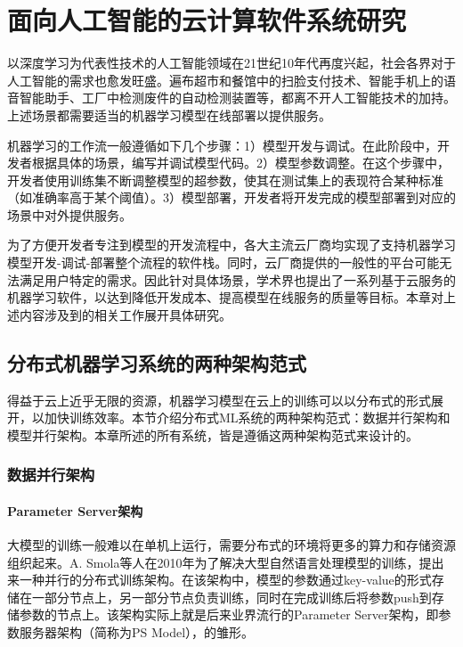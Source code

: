 
\chapter{面向人工智能的云计算软件系统研究}
以深度学习为代表性技术的人工智能领域在21世纪10年代再度兴起，社会各界对于人工智能的需求也愈发旺盛。遍布超市和餐馆中的扫脸支付技术、智能手机上的语音智能助手、工厂中检测废件的自动检测装置等，都离不开人工智能技术的加持。上述场景都需要适当的机器学习模型在线部署以提供服务。

机器学习的工作流一般遵循如下几个步骤：1）模型开发与调试。在此阶段中，开发者根据具体的场景，编写并调试模型代码。2）模型参数调整。在这个步骤中，开发者使用训练集不断调整模型的超参数，使其在测试集上的表现符合某种标准（如准确率高于某个阈值）。3）模型部署，开发者将开发完成的模型部署到对应的场景中对外提供服务。

为了方便开发者专注到模型的开发流程中，各大主流云厂商均实现了支持机器学习模型开发-调试-部署整个流程的软件栈。同时，云厂商提供的一般性的平台可能无法满足用户特定的需求。因此针对具体场景，学术界也提出了一系列基于云服务的机器学习软件，以达到降低开发成本、提高模型在线服务的质量等目标。本章对上述内容涉及到的相关工作展开具体研究。

\section{分布式机器学习系统的两种架构范式}

得益于云上近乎无限的资源，机器学习模型在云上的训练可以以分布式的形式展开，以加快训练效率。本节介绍分布式ML系统的两种架构范式：数据并行架构和模型并行架构。本章所述的所有系统，皆是遵循这两种架构范式来设计的。

\subsection{数据并行架构}

\subsubsection{Parameter Server架构}
大模型的训练一般难以在单机上运行，需要分布式的环境将更多的算力和存储资源组织起来。A. Smola等人\parencite{smola2010an}在2010年为了解决大型自然语言处理模型的训练，提出来一种并行的分布式训练架构。在该架构中，模型的参数通过key-value的形式存储在一部分节点上，另一部分节点负责训练，同时在完成训练后将参数push到存储参数的节点上。该架构实际上就是后来业界流行的Parameter Server架构，即参数服务器架构（简称为PS Model），的雏形。

